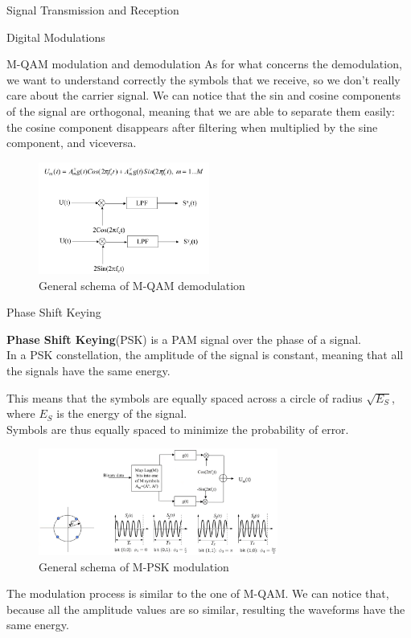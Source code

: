 \begin{section}{Signal Transmission and Reception}
\begin{subsection}{Digital Modulations}
\begin{subsubsection}{M-QAM modulation and demodulation}
      As for what concerns the demodulation, we want to understand correctly the symbols that we
      receive, so we don't really care about the carrier signal. 
      We can notice that the sin and cosine components of the signal are orthogonal, meaning that
      we are able to separate them easily: the cosine component disappears after filtering when multiplied
      by the sine component, and viceversa.\\
      \begin{figure}[h]
        \centering
        \includegraphics[width=0.5\textwidth]{img/wireless/MQAM demodulation.png}
        \caption{General schema of M-QAM demodulation}
        \label{fig:MQAM demodulation}
      \end{figure}
    \end{subsubsection}
    \begin{subsubsection}{Phase Shift Keying}
      \begin{boxH}
        \textbf{Phase Shift Keying}(PSK) is a PAM signal over the phase of a signal.\\
        In a PSK constellation, the amplitude of the signal is constant, meaning that
        all the signals have the same energy.
      \end{boxH}

      This means that the symbols are equally spaced across a circle of radius $\sqrt{E_S}$, where
      $E_S$ is the energy of the signal.\\
      Symbols are thus equally spaced to minimize the probability of error.\\

      \begin{figure}[h]
        \centering
        \includegraphics[width=0.7\textwidth]{img/wireless/MPSK modulation.png}
        \caption{General schema of M-PSK modulation}
        \label{fig:MPSK modulation}
      \end{figure}
      The modulation process is similar to the one of M-QAM. We can notice that, because all the 
      amplitude values are so similar, resulting the waveforms have the same energy.
    \end{subsubsection}


\end{subsection}
\end{section}
